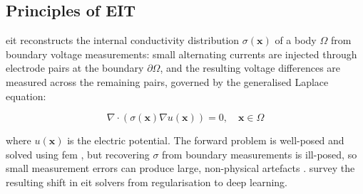 \subsection{Principles of EIT}
\label{sec:lit-eit-principles}

\gls{eit} reconstructs the internal conductivity distribution $\sigma(\mathbf{x})$ of a body $\Omega$ from boundary voltage measurements: small alternating currents are injected through electrode pairs at the boundary $\partial\Omega$, and the resulting voltage differences are measured across the remaining pairs, governed by the generalised Laplace equation:

\begin{equation}
\nabla \cdot (\sigma(\mathbf{x}) \nabla u(\mathbf{x})) = 0, \quad \mathbf{x} \in \Omega
\label{eq:eit-forward}
\end{equation}

\noindent where $u(\mathbf{x})$ is the electric potential. The forward problem is well-posed and solved using \gls{fem} \parencite{cheney1999, adler2006}, but recovering $\sigma$ from boundary measurements is ill-posed, so small measurement errors can produce large, non-physical artefacts \parencite{cheney1999}. \textcite{dimas2024} survey the resulting shift in \gls{eit} solvers from regularisation to deep learning.


